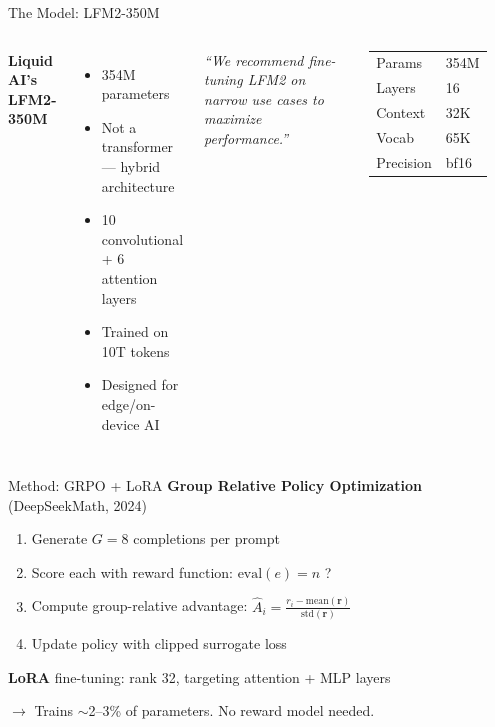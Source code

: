 \documentclass[aspectratio=169]{beamer}
\begin{document}
\begin{frame}{The Model: LFM2-350M}
    \begin{columns}
        \textbf{Liquid AI's LFM2-350M}
        \begin{itemize}
            \item 354M parameters
            \item \alert{Not a transformer} --- hybrid architecture
            \item 10 convolutional + 6 attention layers
            \item Trained on 10T tokens
            \item Designed for edge/on-device AI
        \end{itemize}

        \vspace{0.5em}
        \textit{``We recommend fine-tuning LFM2 on narrow use cases to maximize performance.''}

        \centering
        \begin{tabular}{ll}
            \toprule
            Params & 354M \\
            Layers & 16 \\
            Context & 32K \\
            Vocab & 65K \\
            Precision & bf16 \\
            \bottomrule
        \end{tabular}
    \end{columns}
\end{frame}

\begin{frame}{Method: GRPO + LoRA}
    \textbf{Group Relative Policy Optimization} (DeepSeekMath, 2024)

    \begin{enumerate}
        \item Generate $G = 8$ completions per prompt
        \item Score each with reward function: $\text{eval}(e) = n$ ?
        \item Compute group-relative advantage: $\hat{A}_i = \frac{r_i - \text{mean}(\mathbf{r})}{\text{std}(\mathbf{r})}$
        \item Update policy with clipped surrogate loss
    \end{enumerate}

    \vspace{1em}
    \textbf{LoRA} fine-tuning: rank 32, targeting attention + MLP layers

    \vspace{0.5em}
    $\rightarrow$ Trains $\sim$2--3\% of parameters. No reward model needed.
\end{frame}
\end{document}
